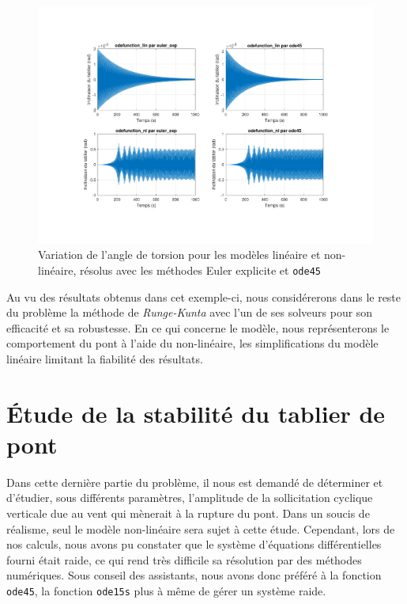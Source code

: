 \documentclass[a4paper, 12pt]{article}
\begin{document}
	\begin{figure}[H]
		\centering
		\includegraphics[width = \textwidth]{resources/pdf/Q2_angle.pdf}
		\caption{Variation de l'angle de torsion pour les modèles linéaire et non-linéaire, résolus avec les méthodes Euler explicite et \texttt{ode45}}
	\end{figure}
	Au vu des résultats obtenus dans cet exemple-ci, nous considérerons dans le reste du problème la méthode de \textit{Runge-Kunta} avec l’un de ses solveurs pour son efficacité et sa robustesse. En ce qui concerne le modèle, nous représenterons le comportement du pont à l’aide du non-linéaire, les simplifications du modèle linéaire limitant la fiabilité des résultats.
	\section{Étude de la stabilité du tablier de pont}
	Dans cette dernière partie du problème, il nous est demandé de déterminer et d'étudier, sous différents paramètres, l'amplitude de la sollicitation cyclique verticale due au vent qui mènerait à la rupture du pont. Dans un soucis de réalisme, seul le modèle non-linéaire sera sujet à cette étude. Cependant, lors de nos calculs, nous avons pu constater que le système d'équations différentielles fourni était raide, ce qui rend très difficile sa résolution par des méthodes numériques. Sous conseil des assistants, nous avons donc préféré à la fonction \texttt{ode45}, la fonction \texttt{ode15s} plus à même de gérer un système raide.
\end{document}
